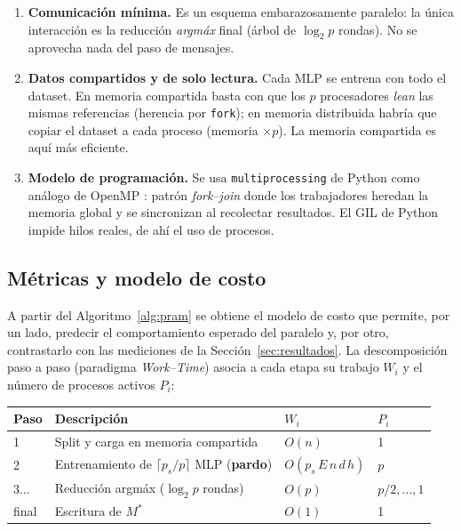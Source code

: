 \documentclass[11pt,a4paper]{article}
\begin{document}
\begin{enumerate}
  \item \textbf{Comunicación mínima.} Es un esquema embarazosamente paralelo:
        la única interacción es la reducción \emph{arg\-máx} final (árbol de
        $\log_2 p$ rondas). No se aprovecha nada del paso de mensajes.
  \item \textbf{Datos compartidos y de solo lectura.} Cada MLP se entrena con
        todo el dataset. En memoria compartida basta con que los $p$
        procesadores \emph{lean} las mismas referencias (herencia por
        \texttt{fork}); en memoria distribuida habría que copiar el dataset a
        cada proceso (memoria $\times p$). La memoria compartida es aquí más
        eficiente.
  \item \textbf{Modelo de programación.} Se usa \texttt{multiprocessing} de
        Python como análogo de OpenMP \cite{dagum1998,chapman2007}: patrón
        \emph{fork--join} donde los trabajadores heredan la memoria global y se
        sincronizan al recolectar resultados. El GIL de Python impide hilos
        reales, de ahí el uso de procesos.
\end{enumerate}

\subsection{Métricas y modelo de costo}
\label{sec:metricas}

A partir del Algoritmo~\ref{alg:pram} se obtiene el modelo de costo que permite,
por un lado, predecir el comportamiento esperado del paralelo y, por otro,
contrastarlo con las mediciones de la Sección~\ref{sec:resultados}. La
descomposición paso a paso (paradigma \emph{Work--Time}) asocia a cada etapa su
trabajo $W_i$ y el número de procesos activos $P_i$:

\begin{center}\small
\begin{tabular}{llll}
\toprule
Paso & Descripción & $W_i$ & $P_i$ \\\midrule
1 & Split y carga en memoria compartida & $O(n)$ & 1 \\
2 & Entrenamiento de $\lceil p_s/p\rceil$ MLP (\textbf{pardo}) & $O(p_s\,E\,n\,d\,h)$ & $p$ \\
$3\dots$ & Reducción arg\-máx ($\log_2 p$ rondas) & $O(p)$ & $p/2,\dots,1$ \\
final & Escritura de $M^\ast$ & $O(1)$ & 1 \\
\bottomrule
\end{tabular}
\end{center}
\end{document}
